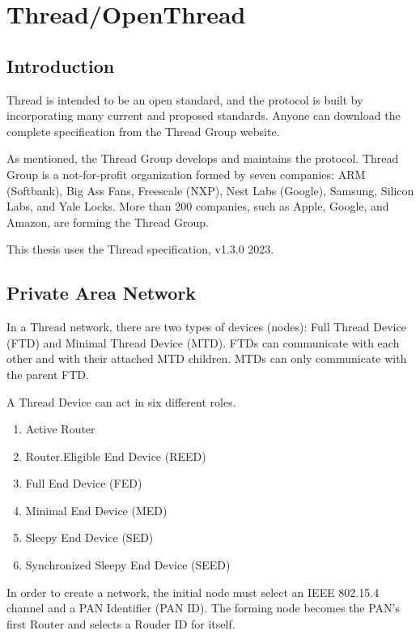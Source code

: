 \section{Thread/OpenThread}
\label{sec:ot}

\subsection{Introduction}
\label{sec:ot:intro}
Thread is intended to be an open standard, and the protocol is built by incorporating many
current and proposed standards.\cite{unwala:2018}
Anyone can download the complete specification from the Thread Group website. \cite{thread:130}

As mentioned, the Thread Group develops and maintains the protocol.
Thread Group is a not-for-profit organization formed by seven companies:
ARM (Softbank), Big Ass Fans, Freescale (NXP), Nest Labs (Google), Samsung, Silicon Labs, and Yale Locks.
More than 200 companies, such as Apple, Google, and Amazon, are forming the Thread Group. \cite{thread:members}

This thesis uses the Thread specification, v1.3.0 2023.

\subsection{Private Area Network}
\label{sec:ot:pan}
In a Thread network, there are two types of devices (nodes): Full Thread Device (FTD) and Minimal Thread Device (MTD). FTDs can communicate with each other and with their attached MTD children. MTDs can only communicate with the parent FTD.

A Thread Device can act in six different roles.
\begin{enumerate}
    \item Active Router
    \item Router.Eligible End Device (REED)
    \item Full End Device (FED)
    \item Minimal End Device (MED)
    \item Sleepy End Device (SED)
    \item Synchronized Sleepy End Device (SEED)
\end{enumerate}

In order to create a network, the initial node must select an IEEE 802.15.4 channel and
a PAN Identifier (PAN ID).
The forming node becomes the PAN's first Router and selects a Rouder ID for itself.

